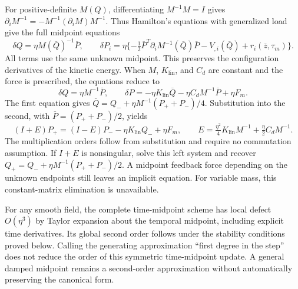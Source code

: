 For positive-definite $M(Q)$, differentiating $M^{-1}M=I$ gives $\partial_iM^{-1}=-M^{-1}(\partial_iM)M^{-1}$. Thus Hamilton's equations with generalized load give the full midpoint equations
\begin{equation}
 \delta Q=\eta M(\overline Q)^{-1}\overline P,\qquad
 \delta P_i=\eta\{-\tfrac12\overline P^T\partial_iM^{-1}(\overline Q)\overline P
                    -V_{,i}(\overline Q)+r_i(\overline z,\tau_m)\}.
 \label{eq:sup-full-midpoint}
\end{equation}
All terms use the same unknown midpoint. This preserves the configuration derivatives of the kinetic energy. When $M$, $K_{\mathrm{lin}}$, and $C_d$ are constant and the force is prescribed, the equations reduce to
\begin{equation}
 \delta Q=\eta M^{-1}\overline P,\qquad
 \delta P=-\eta K_{\mathrm{lin}}\overline Q-\eta C_dM^{-1}\overline P+\eta F_m.
 \label{eq:sup-constant-midpoint}
\end{equation}
The first equation gives $\overline Q=Q_-+\eta M^{-1}(P_++P_-)/4$. Substitution into the second, with $\overline P=(P_++P_-)/2$, yields
\begin{equation}
 (I+E)P_+=(I-E)P_- -\eta K_{\mathrm{lin}}Q_-+\eta F_m,
 \qquad E=\tfrac{\eta^2}{4}K_{\mathrm{lin}}M^{-1}+\tfrac\eta2 C_dM^{-1}.
 \label{eq:sup-leftsolve-proof}
\end{equation}
The multiplication orders follow from substitution and require no commutation assumption. If $I+E$ is nonsingular, solve this left system and recover $Q_+=Q_-+\eta M^{-1}(P_++P_-)/2$. A midpoint feedback force depending on the unknown endpoints still leaves an implicit equation. For variable mass, this constant-matrix elimination is unavailable.

For any smooth field, the complete time-midpoint scheme has local defect $O(\eta^3)$ by Taylor expansion about the temporal midpoint, including explicit time derivatives. Its global second order follows under the stability conditions proved below. Calling the generating approximation ``first degree in the step'' does not reduce the order of this symmetric time-midpoint update. A general damped midpoint remains a second-order approximation without automatically preserving the canonical form.

